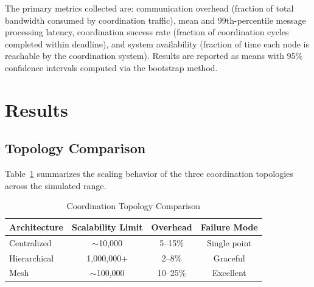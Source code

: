 \documentclass[journal]{IEEEtran}
\begin{document}
The primary metrics collected are: communication overhead (fraction of total bandwidth consumed by coordination traffic), mean and 99th-percentile message processing latency, coordination success rate (fraction of coordination cycles completed within deadline), and system availability (fraction of time each node is reachable by the coordination system). Results are reported as means with 95\% confidence intervals computed via the bootstrap method.


\section{Results}

\subsection{Topology Comparison}

Table~\ref{tab:topology_comparison} summarizes the scaling behavior of the three coordination topologies across the simulated range.

\begin{table}[t]
    \centering
    \caption{Coordination Topology Comparison}
    \label{tab:topology_comparison}
    \begin{tabular}{@{}lccc@{}}
        \toprule
        \textbf{Architecture} & \textbf{Scalability Limit} & \textbf{Overhead} & \textbf{Failure Mode} \\
        \midrule
        Centralized  & $\sim$10{,}000    & 5--15\%  & Single point \\
        Hierarchical & 1{,}000{,}000+    & 2--8\%   & Graceful \\
        Mesh         & $\sim$100{,}000   & 10--25\% & Excellent \\
        \bottomrule
    \end{tabular}
\end{table}

\end{document}
